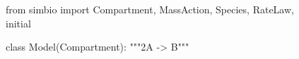 \documentclass[namedate,numsec,webpdf,modern,large]{oup-authoring-template}
\theoremstyle{thmstyleone}%
\theoremstyle{thmstyletwo}%
\theoremstyle{thmstylethree}%
\newenvironment{CodeInput}{\begin{tcolorbox}[title=input,boxrule=0pt]}{\end{tcolorbox}}
\newcommand{\KeywordTok}[1]{\textcolor[rgb]{0.00,0.13,1.00}{#1}}
\newcommand{\ClassTok}[1]{\textcolor[rgb]{0.27,0.56,0.65}{#1}}
\newcommand{\FunctionTok}[1]{\textcolor[rgb]{0.47,0.37,0.15}{#1}}
\newcommand{\CommentTok}[1]{\textcolor[rgb]{0.00,0.50,0.00}{#1}}
\begin{document}
\begin{figure}[t]

  \begin{minipage}[t]{\linewidth}
    \centering 
    \begin{CodeInput}
    \begin{Highlighting}[]
    \KeywordTok{from}\ClassTok{ simbio }\KeywordTok{import}\ClassTok{ Compartment, MassAction, Species, RateLaw, \FunctionTok{initial}}
    \end{Highlighting}
    \end{CodeInput}
  \end{minipage}%
  \newline
  \begin{minipage}[t]{\linewidth}
    \centering 
    \begin{minipage}[c]{0.60\linewidth}
      \centering 
      \begin{CodeInput}
      \begin{Highlighting}[]
        \KeywordTok{class}\ClassTok{ Model}\KeywordTok{(}\ClassTok{Compartment}\KeywordTok{)}:
            \CommentTok{"""2A {-}\textgreater{} B"""}
        

\end{Highlighting}
\end{CodeInput}
\end{minipage}
\end{minipage}
\end{figure}
\end{document}
